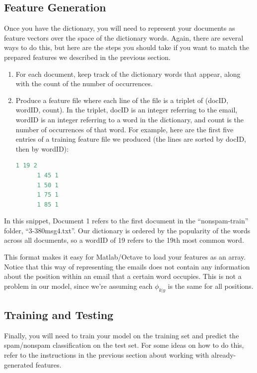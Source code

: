 \documentclass[10pt,a4paper]{article}
\begin{document}
  \subsection{Feature Generation}
  Once you have the dictionary, you will need to represent your documents as feature vectors over the space of the dictionary words. Again, there are several ways to do this, but here are the steps you should take if you want to match the prepared features we described in the previous section.
  \begin{enumerate}
    \item For each document, keep track of the dictionary words that appear, along with the count of the number of occurrences.
    \item Produce a feature file where each line of the file is a triplet of (docID, wordID, count). In the triplet, docID is an integer referring to the email, wordID is an integer referring to a word in the dictionary, and count is the number of occurrences of that word. For example, here are the first five entries of a training feature file we produced (the lines are sorted by docID, then by wordID):
    \begin{lstlisting}[language=C, basicstyle=\footnotesize, showspaces=false]
      1 19 2
      1 45 1
      1 50 1
      1 75 1
      1 85 1
    \end{lstlisting}
  \end{enumerate}

  In this snippet, Document 1 refers to the first document in the ``nonspam-train'' folder, ``3-380msg4.txt''. Our dictionary is ordered by the popularity of the words across all documents, so a wordID of 19 refers to the 19th most common word.

  This format makes it easy for Matlab/Octave to load your features as an array. Notice that this way of representing the emails does not contain any information about the position within an email that a certain word occupies. This is not a problem in our model, since we're assuming each $\phi_{k\vert y}$ is the same for all positions.



  \subsection{Training and Testing}
  Finally, you will need to train your model on the training set and predict the spam/nonspam classification on the test set. For some ideas on how to do this, refer to the instructions in the previous section about working with already-generated features.
\end{document}
